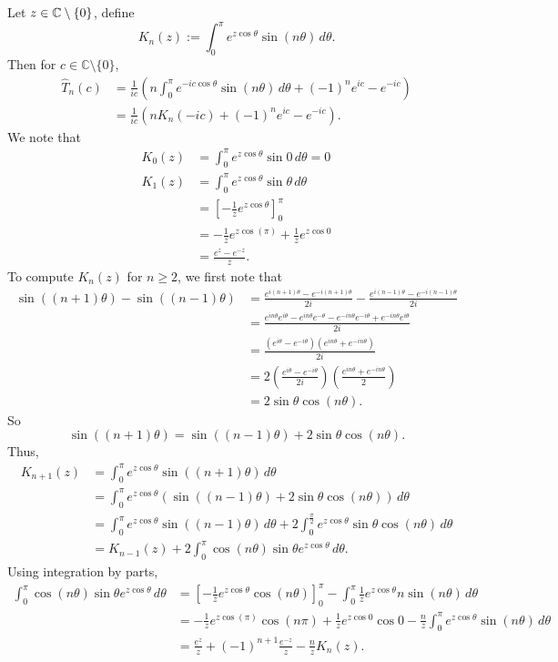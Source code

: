 \documentclass[12pt, oneside, a4paper]{article}
\begin{document}
Let $z\in \mathbb C\setminus\{0\}$, define 
\[K_n(z):=\int_0^\pi e^{z\cos\theta}\sin(n\theta)\,d\theta.\]
Then for $c\in\mathbb{C}\setminus\{0\}$,
\begin{align*}
\hat{T}_n(c) &= \frac{1}{ic}\left(n\int_0^{\pi}e^{-ic\cos\theta}\sin(n\theta)\,d\theta + (-1)^n e^{ic}- e^{-ic}\right)\\
&= \frac{1}{ic}\left(nK_n(-ic) + (-1)^n e^{ic} - e^{-ic}\right).
\end{align*}
We note that
\begin{align*}
K_0(z) &= \int_0^{\pi}e^{z\cos\theta}\sin 0\,d\theta=0\\
K_1(z) &= \int_0^{\pi}e^{z\cos\theta}\sin\theta\,d\theta\\
&= \left[-\frac{1}{z}e^{z\cos\theta}\right]_0^{\pi}\\
&= -\frac{1}{z}e^{z\cos(\pi)} + \frac{1}{z}e^{z\cos 0}\\
&= \frac{e^z - e^{-z}}{z}.
\end{align*}
To compute $K_n(z)$ for $n\geq 2$, we first note that
\begin{align*}
\sin((n+1)\theta) - \sin((n-1)\theta) &= \frac{e^{i(n+1)\theta} - e^{-i(n+1)\theta}}{2i} - \frac{e^{i(n-1)\theta} - e^{-i(n-1)\theta}}{2i}\\
&= \frac{e^{in\theta}e^{i\theta} - e^{in\theta}e^{-\theta} - e^{-in\theta}e^{-i\theta} + e^{-in\theta}e^{i\theta}}{2i}\\
&= \frac{(e^{i\theta}-e^{-i\theta})(e^{in\theta}+e^{-in\theta})}{2i}\\
&= 2\left(\frac{e^{i\theta}-e^{-i\theta}}{2i}\right)\left(\frac{e^{in\theta}+e^{-in\theta}}{2}\right)\\
&= 2\sin\theta\cos(n\theta).
\end{align*}
So
$$\sin((n+1)\theta) = \sin((n-1)\theta) + 2\sin\theta\cos(n\theta).$$
Thus,
\begin{align*}
K_{n+1}(z) &= \int_0^{\pi}e^{z\cos\theta}\sin((n+1)\theta)\,d\theta\\
&= \int_0^{\pi}e^{z\cos\theta}(\sin((n-1)\theta) + 2\sin\theta\cos(n\theta))\,d\theta\\
&= \int_0^{\pi}e^{z\cos\theta}\sin((n-1)\theta)\,d\theta + 2\int_0^{\frac{\pi}{2}}e^{z\cos\theta}\sin\theta\cos(n\theta)\,d\theta\\
&= K_{n-1}(z) + 2\int_0^{\pi}\cos(n\theta)\sin\theta e^{z\cos\theta}\,d\theta.
\end{align*}
Using integration by parts,
\begin{align*}
\int_0^{\pi}\cos(n\theta)\sin\theta e^{z\cos\theta}\,d\theta &= \left[-\frac{1}{z}e^{z\cos\theta}\cos(n\theta)\right]_0^{\pi} - \int_0^{\pi}\frac{1}{z}e^{z\cos\theta}n\sin(n\theta)\,d\theta\\
&= -\frac{1}{z}e^{z\cos(\pi)}\cos(n\pi) + \frac{1}{z}e^{z\cos 0}\cos 0 - \frac{n}{z}\int_0^{\pi}e^{z\cos\theta}\sin(n\theta)\,d\theta\\
&= \frac{e^z}{z} + (-1)^{n+1}\frac{e^{-z}}{z} - \frac{n}{z}K_n(z).
\end{align*}
\end{document}
